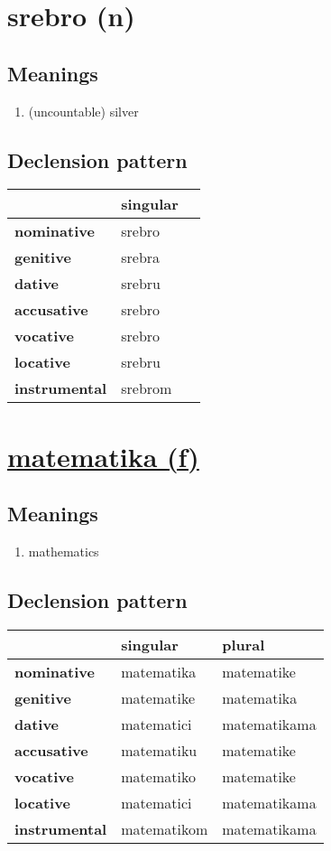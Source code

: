 \filbreak
\section{srebro (n)}
\subsection*{Meanings}
\begin{enumerate}
\item (uncountable) silver
\end{enumerate}
\subsection*{Declension pattern}
\begin{tabularx}{\linewidth}{Xll}
\toprule
{} & singular \\
\midrule
\textbf{nominative  } &   srebro \\
\textbf{genitive    } &   srebra \\
\textbf{dative      } &   srebru \\
\textbf{accusative  } &   srebro \\
\textbf{vocative    } &   srebro \\
\textbf{locative    } &   srebru \\
\textbf{instrumental} &  srebrom \\
\bottomrule
\end{tabularx}

\filbreak
\section{\underline{matematika (f)}}
\subsection*{Meanings}
\begin{enumerate}
\item mathematics
\end{enumerate}
\subsection*{Declension pattern}
\begin{tabularx}{\linewidth}{Xll}
\toprule
{} &     singular &        plural \\
\midrule
\textbf{nominative  } &   matematika &    matematike \\
\textbf{genitive    } &   matematike &    matematika \\
\textbf{dative      } &   matematici &  matematikama \\
\textbf{accusative  } &   matematiku &    matematike \\
\textbf{vocative    } &   matematiko &    matematike \\
\textbf{locative    } &   matematici &  matematikama \\
\textbf{instrumental} &  matematikom &  matematikama \\
\bottomrule
\end{tabularx}

